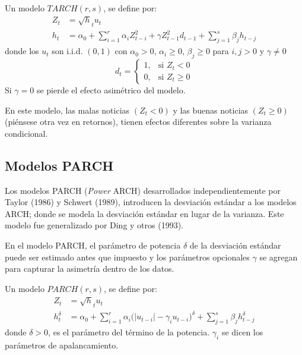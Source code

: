 \begin{definicion}
Un modelo $TARCH(r,s)$, se define por:
\begin{align*}
  Z_{t}&=\sqrt h_{t} u_{t} \\ 
 h_{t}&=\alpha_{0}+\sum_{i=1}^r {\alpha_{i}Z_{t-i}^{2}} +\gamma Z_{t-1}^{2}d_{t-1}+\sum_{j=1}^s {\beta_{j}h_{t-j}}
\end{align*}
donde los $u_{t}$ son i.i.d. $(0,1)$ con $\alpha_{0}>0$, $\alpha_{i}\geq 0$, $\beta_{j}\geq 0$ para $i,j>0$ y $\gamma \neq 0$
\[
d_{t}=\begin{cases}
       1,& \text{si }Z_{t}<0 \\ 
	   0,& \text{si }Z_{t}\ge 0
      \end{cases}
\]
Si $\gamma =0$ se pierde el efecto asim\'{e}trico del modelo.
\end{definicion}

En este modelo, las malas noticias $(Z_{t}<0)$ y las buenas noticias $(Z_{t}\geq 0)$ (pi\'{e}nsese otra vez en retornos), tienen efectos diferentes sobre la varianza condicional.

\subsection*{Modelos PARCH}

Los modelos PARCH (\textit{Power }ARCH) desarrollados independientemente por Taylor (1986) y Schwert (1989), introducen la desviaci\'{o}n est\'{a}ndar a los modelos ARCH; donde se modela la desviaci\'{o}n est\'{a}ndar en lugar de la varianza. Este modelo fue generalizado por Ding y otros (1993).\newline

En el modelo PARCH, el par\'{a}metro de potencia $\delta $ de la desviaci\'{o}n est\'{a}ndar puede ser estimado antes que impuesto y los par\'{a}metros opcionales $\gamma $ se agregan para capturar la asimetr\'{i}a dentro de los datos. 

\begin{definicion}
Un modelo $PARCH(r,s)$, se define por:
\begin{align*}
 Z_{t}&=\sqrt h_{t} u_{t} \\ 
 h_{t}^{\delta }&=\alpha_{0}+\sum_{i=1}^r {\alpha_{i}(\left| u_{t-i}\right|-} \gamma_{i}{u_{t-i})}^{\delta }+\sum_{j=1}^s {\beta_{j}h_{t-j}^{\delta }}
\end{align*}
donde $\delta >0$, es el par\'{a}metro del t\'{e}rmino de la potencia. $\gamma_{i}$ se dicen los par\'{a}metros de apalancamiento. 
\end{definicion}

